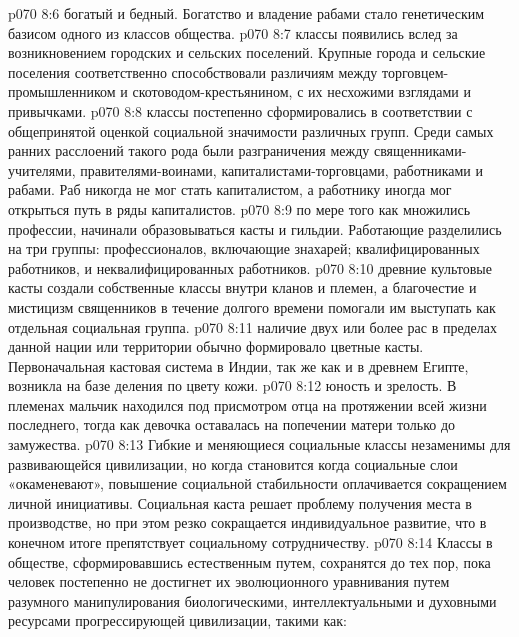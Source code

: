 \vs p070 8:6 \pc {}\bibnobreakspace {} богатый и бедный. Богатство и владение рабами стало генетическим базисом одного из классов общества.
\vs p070 8:7 \pc {}\bibnobreakspace {} классы появились вслед за возникновением городских и сельских поселений. Крупные города и сельские поселения соответственно способствовали различиям между торговцем\hyp{}промышленником и скотоводом\hyp{}крестьянином, с их несхожими взглядами и привычками.
\vs p070 8:8 \pc {}\bibnobreakspace {} классы постепенно сформировались в соответствии с общепринятой оценкой социальной значимости различных групп. Среди самых ранних расслоений такого рода были разграничения между священниками\hyp{}учителями, правителями\hyp{}воинами, капиталистами\hyp{}торговцами, работниками и рабами. Раб никогда не мог стать капиталистом, а работнику иногда мог открыться путь в ряды капиталистов.
\vs p070 8:9 \pc {}\bibnobreakspace {} по мере того как множились профессии, начинали образовываться касты и гильдии. Работающие разделились на три группы: профессионалов, включающие знахарей; квалифицированных работников, и неквалифицированных работников.
\vs p070 8:10 \pc {}\bibnobreakspace {} древние культовые касты создали собственные классы внутри кланов и племен, а благочестие и мистицизм священников в течение долгого времени помогали им выступать как отдельная социальная группа.
\vs p070 8:11 \pc {}\bibnobreakspace {} наличие двух или более рас в пределах данной нации или территории обычно формировало цветные касты. Первоначальная кастовая система в Индии, так же как и в древнем Египте, возникла на базе деления по цвету кожи.
\vs p070 8:12 \pc {}\bibnobreakspace {} юность и зрелость. В племенах мальчик находился под присмотром отца на протяжении всей жизни последнего, тогда как девочка оставалась на попечении матери только до замужества.
\vs p070 8:13 \pc Гибкие и меняющиеся социальные классы незаменимы для развивающейся цивилизации, но когда  становится  когда социальные слои «окаменевают», повышение социальной стабильности оплачивается сокращением личной инициативы. Социальная каста решает проблему получения места в производстве, но при этом резко сокращается индивидуальное развитие, что в конечном итоге препятствует социальному сотрудничеству.
\vs p070 8:14 Классы в обществе, сформировавшись естественным путем, сохранятся до тех пор, пока человек постепенно не достигнет их эволюционного уравнивания путем разумного манипулирования биологическими, интеллектуальными и духовными ресурсами прогрессирующей цивилизации, такими как:
